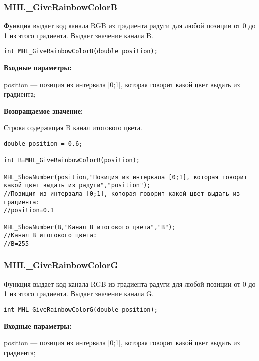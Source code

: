 \documentclass[a4paper,12pt]{article}
\begin{document}
\subsubsection{MHL\_GiveRainbowColorB}\label{MHL_GiveRainbowColorB}

Функция выдает код канала RGB из градиента радуги для любой позиции от 0 до 1 из этого градиента. Выдает значение канала B.


\begin{lstlisting}[label=code_syntax_MHL_GiveRainbowColorB,caption=Синтаксис]
int MHL_GiveRainbowColorB(double position);
\end{lstlisting}

\textbf{Входные параметры:}  

position --- позиция из интервала [0;1], которая говорит какой цвет выдать из градиента;

\textbf{Возвращаемое значение:}

Строка содержащая B канал итогового цвета.


\begin{lstlisting}[label=code_use_MHL_GiveRainbowColorB,caption=Пример использования]
double position = 0.6;

int B=MHL_GiveRainbowColorB(position);

MHL_ShowNumber(position,"Позиция из интервала [0;1], которая говорит какой цвет выдать из радуги","position");
//Позиция из интервала [0;1], которая говорит какой цвет выдать из градиента:
//position=0.1

MHL_ShowNumber(B,"Канал B итогового цвета","B");
//Канал B итогового цвета:
//B=255
\end{lstlisting}

\subsubsection{MHL\_GiveRainbowColorG}\label{MHL_GiveRainbowColorG}

Функция выдает код канала RGB из градиента радуги для любой позиции от 0 до 1 из этого градиента. Выдает значение канала G.


\begin{lstlisting}[label=code_syntax_MHL_GiveRainbowColorG,caption=Синтаксис]
int MHL_GiveRainbowColorG(double position);
\end{lstlisting}

\textbf{Входные параметры:}  

position --- позиция из интервала [0;1], которая говорит какой цвет выдать из градиента;
\end{document}
